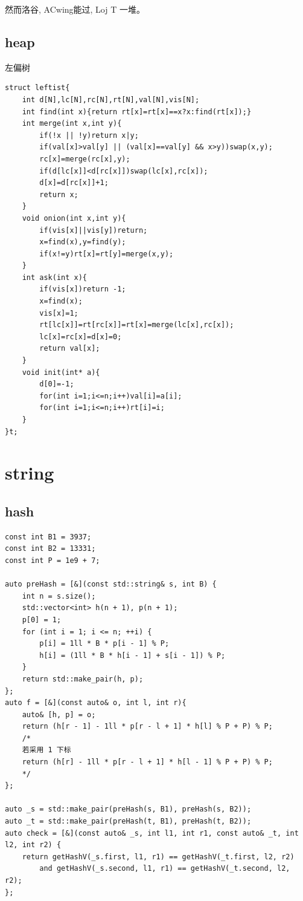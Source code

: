\documentclass[UTF8, a4paper, titlepage, twoside]{ctexart}
\begin{document}
然而洛谷, ACwing能过, Loj T 一堆。

\subsection{ heap }

左偏树
\begin{lstlisting}[style = cpp]
struct leftist{
    int d[N],lc[N],rc[N],rt[N],val[N],vis[N];
    int find(int x){return rt[x]=rt[x]==x?x:find(rt[x]);}
    int merge(int x,int y){
        if(!x || !y)return x|y;
        if(val[x]>val[y] || (val[x]==val[y] && x>y))swap(x,y);
        rc[x]=merge(rc[x],y);
        if(d[lc[x]]<d[rc[x]])swap(lc[x],rc[x]);
        d[x]=d[rc[x]]+1;
        return x;
    }
    void onion(int x,int y){
        if(vis[x]||vis[y])return;
        x=find(x),y=find(y);
        if(x!=y)rt[x]=rt[y]=merge(x,y);
    }
    int ask(int x){
        if(vis[x])return -1;
        x=find(x);
        vis[x]=1;
        rt[lc[x]]=rt[rc[x]]=rt[x]=merge(lc[x],rc[x]);
        lc[x]=rc[x]=d[x]=0;
        return val[x];
    }
    void init(int* a){
        d[0]=-1;
        for(int i=1;i<=n;i++)val[i]=a[i];
        for(int i=1;i<=n;i++)rt[i]=i;
    }
}t;
\end{lstlisting}

\section{ string }

\subsection{ hash }

\begin{lstlisting}[style = cpp]
const int B1 = 3937;
const int B2 = 13331;
const int P = 1e9 + 7;

auto preHash = [&](const std::string& s, int B) {
    int n = s.size();
    std::vector<int> h(n + 1), p(n + 1);
    p[0] = 1;
    for (int i = 1; i <= n; ++i) {
        p[i] = 1ll * B * p[i - 1] % P;
        h[i] = (1ll * B * h[i - 1] + s[i - 1]) % P;
    }
    return std::make_pair(h, p);
};
auto f = [&](const auto& o, int l, int r){
    auto& [h, p] = o;
    return (h[r - 1] - 1ll * p[r - l + 1] * h[l] % P + P) % P;
    /* 
    若采用 1 下标
    return (h[r] - 1ll * p[r - l + 1] * h[l - 1] % P + P) % P;
    */
};

auto _s = std::make_pair(preHash(s, B1), preHash(s, B2));
auto _t = std::make_pair(preHash(t, B1), preHash(t, B2));
auto check = [&](const auto& _s, int l1, int r1, const auto& _t, int l2, int r2) {
    return getHashV(_s.first, l1, r1) == getHashV(_t.first, l2, r2)
        and getHashV(_s.second, l1, r1) == getHashV(_t.second, l2, r2);
};
\end{lstlisting}
\end{document}
